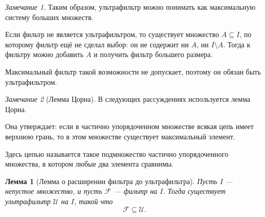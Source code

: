 \documentclass[12pt,a4paper,oneside,openany]{book}
\theoremstyle{definition}
\theoremstyle{plain}
\newtheorem{lemma}{Лемма}[chapter]
\theoremstyle{remark}
\newtheorem{remark}{Замечание}[chapter]
\begin{document}
\begin{remark}
Таким образом, ультрафильтр можно понимать как максимальную систему больших множеств.

Если фильтр не является ультрафильтром, то существует множество $A\subseteq I$, по которому фильтр ещё не сделал выбор: он не содержит ни $A$, ни $I\setminus A$. Тогда к фильтру можно добавить $A$ и получить фильтр большего размера.

Максимальный фильтр такой возможности не допускает, поэтому он обязан быть ультрафильтром.
\end{remark}

\begin{remark}[Лемма Цорна]
В следующих рассуждениях используется лемма Цорна.

Она утверждает: если в частично упорядоченном множестве всякая цепь имеет верхнюю грань, то в этом множестве существует максимальный элемент.

Здесь цепью называется такое подмножество частично упорядоченного множества, в котором любые два элемента сравнимы.
\end{remark}

\begin{lemma}[Лемма о расширении фильтра до ультрафильтра]
Пусть $I$ — непустое множество, и пусть $\mathcal F$ — фильтр на $I$. Тогда существует ультрафильтр $\mathcal U$ на $I$, такой что
\[
\mathcal F\subseteq\mathcal U.
\]
\end{lemma}
\end{document}
